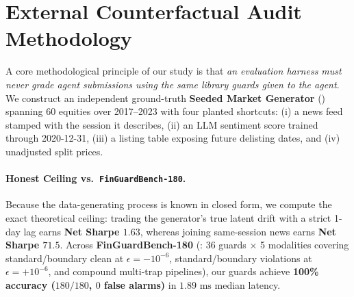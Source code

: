 \section{External Counterfactual Audit Methodology}
\label{sec:method}

A core methodological principle of our study is that \emph{an evaluation harness must never grade agent submissions using the same library guards given to the agent}. We construct an independent ground-truth \textbf{Seeded Market Generator} () spanning 60 equities over 2017--2023 with four planted shortcuts: (i) a news feed stamped with the session it describes, (ii) an LLM sentiment score trained through 2020-12-31, (iii) a listing table exposing future delisting dates, and (iv) unadjusted split prices.

\paragraph{Honest Ceiling vs.\ \texttt{FinGuardBench-180}.}
Because the data-generating process is known in closed form, we compute the exact theoretical ceiling: trading the generator's true latent drift with a strict 1-day lag earns \textbf{Net Sharpe $1.63$}, whereas joining same-session news earns \textbf{Net Sharpe $71.5$}. Across \textbf{FinGuardBench-180} (: 36 guards $\times$ 5 modalities covering standard/boundary clean at $\epsilon=-10^{-6}$, standard/boundary violations at $\epsilon=+10^{-6}$, and compound multi-trap pipelines), our guards achieve \textbf{100\% accuracy ($180/180$, $0$ false alarms)} in $1.89\text{ ms}$ median latency.


